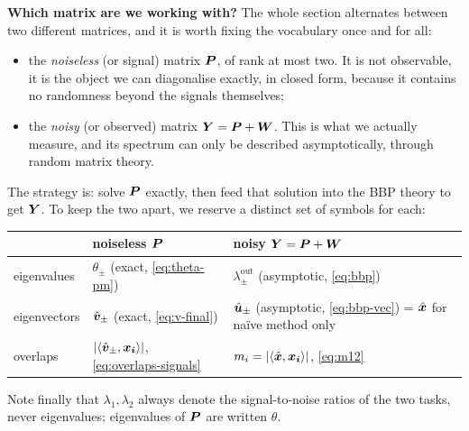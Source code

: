 \documentclass[11pt]{article}
\begin{document}
\medskip
\noindent
\textbf{Which matrix are we working with?} The whole section alternates between two different matrices, and it is worth fixing the vocabulary once and for all:
\begin{itemize}[topsep=2pt,itemsep=1pt]
    \item the \emph{noiseless} (or signal) matrix $\bm{P}$, of rank at most two. It is not observable, it is the object we can diagonalise exactly, in closed form, because it contains no randomness beyond the signals themselves;
    \item the \emph{noisy} (or observed) matrix $\bm{Y} = \bm{P} + \bm{W}$. This is what we actually measure, and its spectrum can only be described asymptotically, through random matrix theory.
\end{itemize}
The strategy is: solve $\bm{P}$ exactly, then feed that solution into the BBP theory to get $\bm{Y}$. To keep the two apart, we reserve a distinct set of symbols for each:
\begin{center}
\begin{tabular}{l|l|l}
 & \textbf{noiseless} $\bm{P}$ & \textbf{noisy} $\bm{Y} = \bm{P} + \bm{W}$ \\
\hline
eigenvalues     & $\theta_\pm$ (exact, \eqref{eq:theta-pm})        & $\lambda^{\mathrm{out}}_\pm$ (asymptotic, \eqref{eq:bbp}) \\
eigenvectors    & $\hat{\bm{v}}_\pm$ (exact, \eqref{eq:v-final})  & $\hat{\bm{u}}_\pm$ (asymptotic, \eqref{eq:bbp-vec}) = $\hat{\bm{x}}$ for naïve method only \\
overlaps        & $|\langle \hat{\bm{v}}_\pm, \bm{x_i}\rangle|$, \eqref{eq:overlaps-signals} & $m_i = |\langle \hat{\bm{x}}, \bm{x_i}\rangle|$, \eqref{eq:m12} \\
\end{tabular}
\end{center}
\noindent
Note finally that $\lambda_1, \lambda_2$ always denote the signal-to-noise ratios of the two tasks, never eigenvalues; eigenvalues of $\bm{P}$ are written $\theta$.
\end{document}
